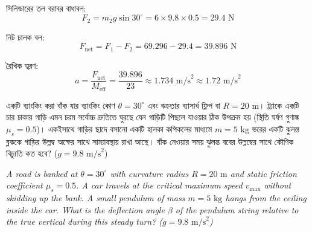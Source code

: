 \documentclass[12pt, a4paper]{article}
\begin{document}
{{\begin{tcolorbox}[solutionbox={সমাধান (Solution)}]
    সিলিন্ডারের তল বরাবর বাধাবল:
    \[ F_2 = m_2 g \sin 30^\circ = 6 \times 9.8 \times 0.5 = 29.4\text{ N} \]
    
    নিট চালক বল:
    \[ F_{\text{net}} = F_1 - F_2 = 69.296 - 29.4 = 39.896\text{ N} \]
    
    রৈখিক ত্বরণ:
    \[ a = \frac{F_{\text{net}}}{M_{\text{eff}}} = \frac{39.896}{23} \approx 1.734\text{ m/s}^2 \approx \mathbf{1.72}\text{ m/s}^2 \]
\end{tcolorbox}

\newpage

\begin{tcolorbox}[questionbox={প্রশ্ন (Question) 24}]
    \noindent
    একটি ব্যাংকিং করা বাঁক যার ব্যাংকিং কোণ $\theta = 30^\circ$ এবং বক্রতার ব্যাসার্ধ ফ্লিপ বা $R = 20\text{ m}$। ট্র্যাকে একটি চার চাকার গাড়ি এমন চরম সর্বোচ্চ দ্রুতিতে ঘুরছে যেন গাড়িটি পিছলে যাওয়ার ঠিক উপক্রম হয় (স্থিতি ঘর্ষণ গুণাঙ্ক $\mu_s = 0.5$)। একইসাথে গাড়ির ছাদে বসানো একটি হালকা কপিকলের মাধ্যমে $m = 5\text{ kg}$ ভরের একটি ঝুলন্ত ব্লককে গাড়ির উল্লম্ব অক্ষের সাথে সাম্যাবস্থায় রাখা আছে। বাঁক নেওয়ার সময় ঝুলন্ত ববের উল্লম্বের সাথে কৌণিক বিচ্যুতি কত হবে? ($g = 9.8\text{ m/s}^2$)
    
    \vspace{0.8em}
    \begin{english}
    \noindent\textit{\color{darkgray}
    A road is banked at $\theta = 30^\circ$ with curvature radius $R = 20\text{ m}$ and static friction coefficient $\mu_s = 0.5$. A car travels at the critical maximum speed $v_{\max}$ without skidding up the bank. A small pendulum of mass $m = 5\text{ kg}$ hangs from the ceiling inside the car. What is the deflection angle $\beta$ of the pendulum string relative to the true vertical during this steady turn? ($g = 9.8\text{ m/s}^2$)
    }
    \end{english}
\end{tcolorbox}

\vspace{1em}
\begin{center}
\end{center}}}
\end{document}
